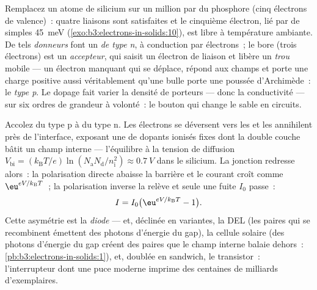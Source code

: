 \begin{definition}[Dopage]\label{def:b3:electrons-in-solids:doping}
Remplacez un atome de silicium sur un million par du phosphore (cinq
électrons de valence)~: quatre liaisons sont satisfaites et le
cinquième électron, lié par de simples \qty{45}{meV}
(\cref{exo:b3:electrons-in-solids:10}), est libre à température
ambiante. De tels \emph{donneurs} font un 
\emph{de type n}, à conduction par électrons~; le bore (trois
électrons) est un \emph{accepteur}, qui saisit un électron de liaison
et libère un \emph{trou} mobile --- un électron manquant qui se
déplace, répond aux champs et porte une charge positive aussi
véritablement qu'une bulle porte une poussée d'Archimède~: le
\emph{type p}. Le dopage fait varier la densité de porteurs --- donc
la conductivité --- sur six ordres de grandeur à volonté~: le bouton
qui change le sable en circuits.
\end{definition}

\begin{proposition}[La jonction p--n]\label{prop:b3:electrons-in-solids:junction}
Accolez du type p à du type n. Les électrons se déversent vers les
 et les annihilent près de l'interface, exposant une \emph{} de dopants ionisés fixes dont la double couche bâtit un
champ interne --- l'équilibre à la tension de diffusion
$V_{\text{bi}} = (k_{\text{B}}T/e)
\ln(N_{\text{a}}N_{\text{d}}/n_{\text{i}}^2) \approx
\qty{0.7}{V}$ dans le silicium. La jonction redresse alors~: la
polarisation directe abaisse la barrière et le courant croît comme
$\eu^{eV/k_{\text{B}}T}$~; la polarisation inverse la relève et seule
une fuite $I_0$ passe~:
\[
I = I_0\big(\eu^{eV/k_{\text{B}}T} - 1\big) .
\]
Cette asymétrie est la \emph{diode} --- et, déclinée en variantes, la
DEL (les paires qui se recombinent émettent des photons d'énergie du
gap), la cellule solaire (des photons d'énergie du gap créent des
paires que le champ interne balaie dehors~:
\cref{pb:b3:electrons-in-solids:1}), et, doublée en sandwich, le
transistor~: l'interrupteur dont une puce moderne imprime des
centaines de milliards d'exemplaires.
\end{proposition}
\admitted

